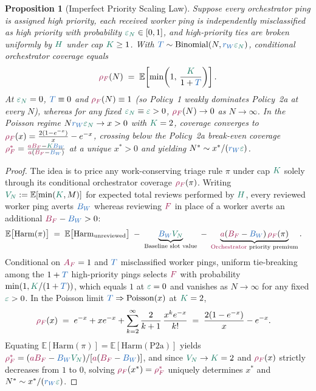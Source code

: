 \documentclass[11pt,reqno]{amsart}
\theoremstyle{spacious}
\newtheorem{proposition}{Proposition}[section]
\newcommand{\Wtxt}[1]{\textcolor{colW}{#1}}
\newcommand{\Ftxt}[1]{\textcolor{colF}{#1}}
\newcommand{\Wv}[1]{{\color{colW}#1}}
\newcommand{\Fv}[1]{{\color{colF}#1}}
\newcommand{\Hv}[1]{{\color{colH}#1}}
\newcommand{\E}{\mathbb{E}}
\begin{document}
\begin{proposition}[Imperfect Priority Scaling Law]
\label{prop:noisy_priority}
Suppose every \Ftxt{orchestrator} ping is assigned high priority, each received \Wtxt{worker} ping is independently misclassified as high priority with probability $\Hv{\varepsilon_N} \in [0,1]$, and high-priority ties are broken uniformly by $\Hv{H}$ under cap $\Hv{K} \ge 1$. With $\Wv{T} \sim \mathrm{Binomial}(N, \Wv{r_W} \Hv{\varepsilon_N})$, conditional \Ftxt{orchestrator} coverage equals
\[
  \Fv{\rho_F}(N) \;=\; \E\!\left[\min\!\left(1,\, \frac{\Hv{K}}{1 + \Wv{T}}\right)\right].
\]
At $\Hv{\varepsilon_N} = 0$, $\Wv{T} \equiv 0$ and $\Fv{\rho_F}(N) \equiv 1$ (so Policy~1 weakly dominates Policy~2a at every $N$), whereas for any fixed $\Hv{\varepsilon_N} \equiv \Hv{\varepsilon} > 0$, $\Fv{\rho_F}(N) \to 0$ as $N \to \infty$. In the Poisson regime $N \Wv{r_W} \Hv{\varepsilon_N} \to x > 0$ with $\Hv{K} = 2$, coverage converges to $\Fv{\rho_F}(x) = \frac{2(1 - e^{-x})}{x} - e^{-x}$, crossing below the Policy~2a break-even coverage $\Fv{\rho_F^*} = \frac{\Fv{a B_F} - \Hv{K} \Wv{B_W}}{\Fv{a}(\Fv{B_F} - \Wv{B_W})}$ at a unique $x^* > 0$ and yielding $N^* \sim x^*/(\Wv{r_W} \Hv{\varepsilon})$.
\end{proposition}

\begin{proof}
The idea is to price any work-conserving triage rule $\pi$ under cap $\Hv{K}$ solely through its conditional \Ftxt{orchestrator} coverage $\Fv{\rho_F}(\pi)$. Writing $\Hv{V_N} := \E[\min(\Hv{K}, M)]$ for expected total reviews performed by $\Hv{H}$, every reviewed \Wtxt{worker} ping averts $\Wv{B_W}$ whereas reviewing $\Fv{F}$ in place of a \Wtxt{worker} averts an additional $\Fv{B_F} - \Wv{B_W} > 0$:
\begin{align*}
  \E\big[\mathrm{Harm}(\pi)\big]
  &\;=\; \E\big[\mathrm{Harm}_{\mathrm{unreviewed}}\big]
     \;-\; \underbrace{\Wv{B_W} \Hv{V_N}}_{\text{Baseline slot value}}
     \;-\; \underbrace{\Fv{a} (\Fv{B_F} - \Wv{B_W})\,\Fv{\rho_F}(\pi)}_{\text{\Ftxt{Orchestrator} priority premium}}.
\end{align*}
Conditional on $\Fv{A_F} = 1$ and $\Wv{T}$ misclassified \Wtxt{worker} pings, uniform tie-breaking among the $1 + \Wv{T}$ high-priority pings selects $\Fv{F}$ with probability $\min(1, \Hv{K}/(1+\Wv{T}))$, which equals $1$ at $\Hv{\varepsilon}=0$ and vanishes as $N \to \infty$ for any fixed $\Hv{\varepsilon} > 0$. In the Poisson limit $\Wv{T} \Rightarrow \mathrm{Poisson}(x)$ at $\Hv{K} = 2$,
\begin{align*}
  \Fv{\rho_F}(x)
  &\;=\; e^{-x} + x e^{-x} + \sum_{k=2}^\infty \frac{2}{k + 1}\,\frac{x^k e^{-x}}{k!}
   \;=\; \frac{2(1 - e^{-x})}{x} - e^{-x}.
\end{align*}
Equating $\E[\mathrm{Harm}(\pi)] = \E[\mathrm{Harm}(\mathrm{P2a})]$ yields $\Fv{\rho_F^*} = (\Fv{a B_F} - \Wv{B_W} \Hv{V_N}) / [\Fv{a}(\Fv{B_F} - \Wv{B_W})]$, and since $\Hv{V_N} \to \Hv{K} = 2$ and $\Fv{\rho_F}(x)$ strictly decreases from $1$ to $0$, solving $\Fv{\rho_F}(x^*) = \Fv{\rho_F^*}$ uniquely determines $x^*$ and $N^* \sim x^*/(\Wv{r_W}\Hv{\varepsilon})$.
\end{proof}
\end{document}
